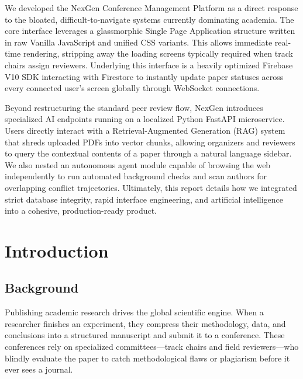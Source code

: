 \documentclass[12pt,a4paper]{report}
\begin{document}
We developed the NexGen Conference Management Platform as a direct response to the bloated, difficult-to-navigate systems currently dominating academia. The core interface leverages a glassmorphic Single Page Application structure written in raw Vanilla JavaScript and unified CSS variants. This allows immediate real-time rendering, stripping away the loading screens typically required when track chairs assign reviewers. Underlying this interface is a heavily optimized Firebase V10 SDK interacting with Firestore to instantly update paper statuses across every connected user’s screen globally through WebSocket connections.

Beyond restructuring the standard peer review flow, NexGen introduces specialized AI endpoints running on a localized Python FastAPI microservice. Users directly interact with a Retrieval-Augmented Generation (RAG) system that shreds uploaded PDFs into vector chunks, allowing organizers and reviewers to query the contextual contents of a paper through a natural language sidebar. We also nested an autonomous agent module capable of browsing the web independently to run automated background checks and scan authors for overlapping conflict trajectories. Ultimately, this report details how we integrated strict database integrity, rapid interface engineering, and artificial intelligence into a cohesive, production-ready product.

\newpage

\tableofcontents
\listoffigures

\newpage

\chapter{Introduction}

\section{Background}
Publishing academic research drives the global scientific engine. When a researcher finishes an experiment, they compress their methodology, data, and conclusions into a structured manuscript and submit it to a conference. These conferences rely on specialized committees—track chairs and field reviewers—who blindly evaluate the paper to catch methodological flaws or plagiarism before it ever sees a journal. 
\end{document}
